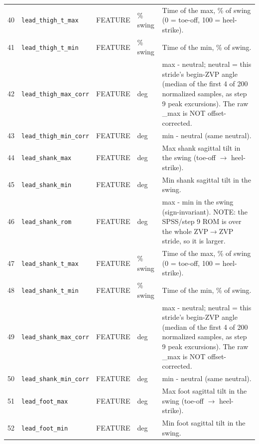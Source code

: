 \begin{longtable}{@{}r p{3.6cm} p{1.55cm} p{1.15cm} p{8.6cm}@{}}
40 & \texttt{lead\_\allowbreak{}thigh\_\allowbreak{}t\_\allowbreak{}max} & FEATURE & \% swing & Time of the max, \% of swing (0 = toe-off, 100 = heel-strike). \\
41 & \texttt{lead\_\allowbreak{}thigh\_\allowbreak{}t\_\allowbreak{}min} & FEATURE & \% swing & Time of the min, \% of swing. \\
42 & \texttt{lead\_\allowbreak{}thigh\_\allowbreak{}max\_\allowbreak{}corr} & FEATURE & deg & max - neutral; neutral = this stride's begin-ZVP angle (median of the first 4 of 200 normalized samples, as step 9 peak excursions). The raw \_max is NOT offset-corrected. \\
43 & \texttt{lead\_\allowbreak{}thigh\_\allowbreak{}min\_\allowbreak{}corr} & FEATURE & deg & min - neutral (same neutral). \\
44 & \texttt{lead\_\allowbreak{}shank\_\allowbreak{}max} & FEATURE & deg & Max shank sagittal tilt in the swing (toe-off $\rightarrow$ heel-strike). \\
45 & \texttt{lead\_\allowbreak{}shank\_\allowbreak{}min} & FEATURE & deg & Min shank sagittal tilt in the swing. \\
46 & \texttt{lead\_\allowbreak{}shank\_\allowbreak{}rom} & FEATURE & deg & max - min in the swing (sign-invariant). NOTE: the SPSS/step 9 ROM is over the whole ZVP$\rightarrow$ZVP stride, so it is larger. \\
47 & \texttt{lead\_\allowbreak{}shank\_\allowbreak{}t\_\allowbreak{}max} & FEATURE & \% swing & Time of the max, \% of swing (0 = toe-off, 100 = heel-strike). \\
48 & \texttt{lead\_\allowbreak{}shank\_\allowbreak{}t\_\allowbreak{}min} & FEATURE & \% swing & Time of the min, \% of swing. \\
49 & \texttt{lead\_\allowbreak{}shank\_\allowbreak{}max\_\allowbreak{}corr} & FEATURE & deg & max - neutral; neutral = this stride's begin-ZVP angle (median of the first 4 of 200 normalized samples, as step 9 peak excursions). The raw \_max is NOT offset-corrected. \\
50 & \texttt{lead\_\allowbreak{}shank\_\allowbreak{}min\_\allowbreak{}corr} & FEATURE & deg & min - neutral (same neutral). \\
51 & \texttt{lead\_\allowbreak{}foot\_\allowbreak{}max} & FEATURE & deg & Max foot sagittal tilt in the swing (toe-off $\rightarrow$ heel-strike). \\
52 & \texttt{lead\_\allowbreak{}foot\_\allowbreak{}min} & FEATURE & deg & Min foot sagittal tilt in the swing. \\

\end{longtable}
